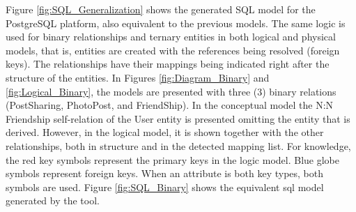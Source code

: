 Figure \ref{fig:SQL_Generalization} shows the generated SQL model for the PostgreSQL platform, also equivalent to the previous models.
The same logic is used for binary relationships and ternary entities in both logical and physical models, that is, entities are created with the references being resolved (foreign keys).
The relationships have their mappings being indicated right after the structure of the entities.
In Figures \ref{fig:Diagram_Binary} and \ref{fig:Logical_Binary}, the models are presented with three (3) binary relations (PostSharing, PhotoPost, and FriendShip).
In the conceptual model the N:N Friendship self-relation of the User entity is presented omitting the entity that is derived.
However, in the logical model, it is shown together with the other relationships, both in structure and in the detected mapping list.
For knowledge, the red key symbols represent the primary keys in the logic model.
Blue globe symbols represent foreign keys.
When an attribute is both key types, both symbols are used.
Figure \ref{fig:SQL_Binary} shows the equivalent \ac{sql} model generated by the tool.

